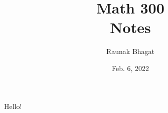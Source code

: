 \documentclass{article}
\begin{document}
\title{Math 300\\Notes}
\author{Raunak Bhagat}
\date{Feb. 6, 2022}
\maketitle

\newpage
Hello!
\end{document}

